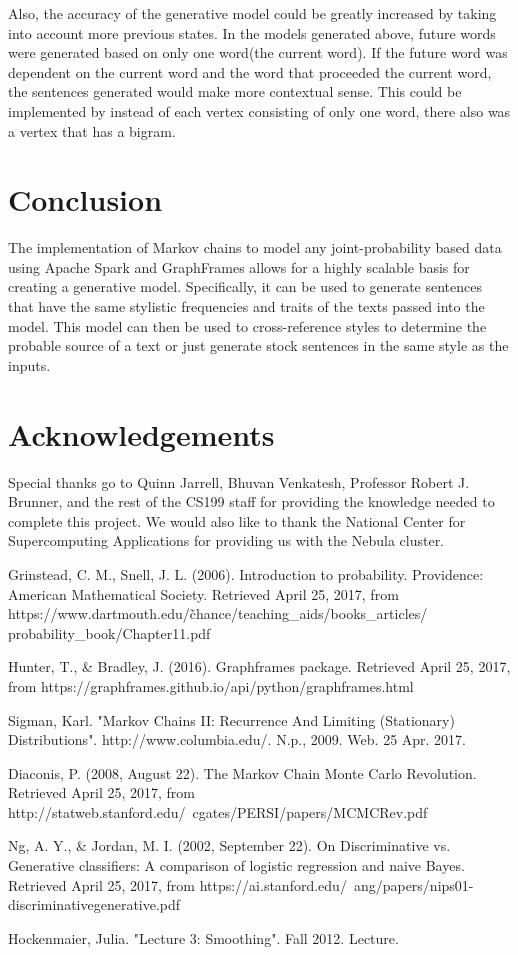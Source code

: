 \documentclass[9pt,twocolumn,twoside]{idsi}
\begin{document}
Also, the accuracy of the generative model could be greatly increased by taking into account more previous states. In the models generated above, future words were generated based on only one word(the current word). If the future word was dependent on the current word and the word that proceeded the current word, the sentences generated would make more contextual sense. This could be implemented by instead of each vertex consisting of only one word, there also was a vertex that has a bigram.
\section{Conclusion}

The implementation of Markov chains to model any joint-probability based data using Apache Spark and GraphFrames allows for a highly scalable basis for creating a generative model. Specifically, it can be used to generate sentences that have the same stylistic frequencies and traits of the texts passed into the model. This model can then be used to cross-reference styles to determine the probable source of a text or just generate stock sentences in the same style as the inputs.

\section{Acknowledgements}
Special thanks go to Quinn Jarrell, Bhuvan Venkatesh, Professor Robert J. Brunner, and the rest of the CS199 staff for providing the knowledge needed to complete this project. We would also like to thank the National Center for Supercomputing Applications for providing us with the Nebula cluster. 


\begin{thebibliography}{1}
Grinstead, C. M., Snell, J. L. (2006). Introduction to probability. Providence: American Mathematical Society. Retrieved April 25, 2017, from https://www.dartmouth.edu/\~chance/teaching\_aids/books\_articles/
probability\_book/Chapter11.pdf

Hunter, T., \& Bradley, J. (2016). Graphframes package. Retrieved April 25, 2017, from https://graphframes.github.io/api/python/graphframes.html

Sigman, Karl. "Markov Chains II: Recurrence And Limiting (Stationary) Distributions". http://www.columbia.edu/. N.p., 2009. Web. 25 Apr. 2017.

Diaconis, P. (2008, August 22). The Markov Chain Monte Carlo Revolution. Retrieved April 25, 2017, from http://statweb.stanford.edu/~cgates/PERSI/papers/MCMCRev.pdf

Ng, A. Y., \& Jordan, M. I. (2002, September 22). On Discriminative vs. Generative classifiers: A comparison of logistic regression and naive Bayes. Retrieved April 25, 2017, from https://ai.stanford.edu/~ang/papers/nips01-discriminativegenerative.pdf

Hockenmaier, Julia. "Lecture 3: Smoothing". Fall 2012. Lecture.
\end{thebibliography}
\end{document}
